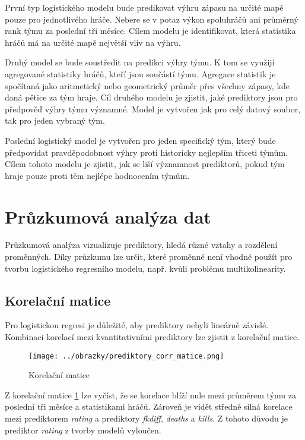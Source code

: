 První typ logistického modelu bude predikovat výhru zápasu na určité mapě pouze pro jednotlivého hráče. Nebere se v potaz
výkon spoluhráčů ani průměrný rank týmu za poslední tři měsíce. Cílem modelu je identifikovat, která statistika hráčů má na určité mapě největší vliv na výhru.

Druhý model se bude soustředit na predikci výhry týmu. K tom se využijí agregované statistiky hráčů, kteří jsou součástí týmu. Agregace statistik je spočítaná jako
aritmetický nebo geometrický průměr přes všechny zápasy, kde daná pětice za tým hraje. Cíl druhého modelu je zjistit, jaké prediktory jsou pro předpověď výhry týmu významné.
Model je vytvořen jak pro celý datový soubor, tak pro jeden vybraný tým.

Poslední logistický model je vytvořen pro jeden specifický tým, který bude předpovídat pravděpodobnost výhry proti historicky nejlepším třiceti týmům. Cílem tohoto modelu
je zjistit, jak se liší významnost prediktorů, pokud tým hraje pouze proti těm nejlépe hodnocením týmům. 

\section{Průzkumová analýza dat}
Průzkumová analýza vizualizuje prediktory, hledá různé vztahy a rozdělení proměnných. Díky průzkumu lze určit, které proměnné není vhodné použít pro tvorbu
logistického regresního modelu, např. kvůli problému multikolinearity.

\newpage
\subsection{Korelační matice}
Pro logistickou regresi je důležité, aby prediktory nebyli lineárně závislé. Kombinaci korelací mezi kvantitativními prediktory lze zjistit z korelační matice.

\begin{figure}[H]
    \centering
    \texttt{[image: ../obrazky/prediktory\_corr\_matice.png]}
    \caption{Korelační matice} 
    \label{fig:korelacni_matice}
\end{figure}

Z korelační matice \ref{fig:korelacni_matice} lze vyčíst, že se korelace blíží nule mezi průměrem týmu za poslední tři měsíce a statistikami hráčů. Zároveň je
vidět středně silná korelace mezi prediktorem \textit{rating} a prediktory \textit{fkdiff}, \textit{deaths} a \textit{kills}. Z tohoto důvodu je
prediktor \textit{rating} z tvorby modelů vyloučen.

